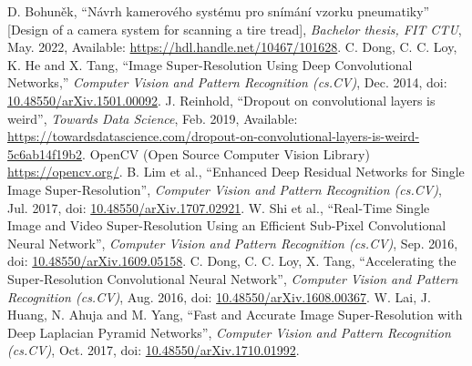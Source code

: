 \documentclass[english]{mvi-report}
\begin{document}
\begin{thebibliography}{9}
 D. Bohuněk, ``Návrh kamerového systému pro snímání vzorku pneumatiky'' [Design of a camera system for scanning a tire tread], \textit{Bachelor thesis, FIT CTU}, May. 2022, Available: \url{https://hdl.handle.net/10467/101628}.
 C. Dong, C. C. Loy, K. He and X. Tang, ``Image Super-Resolution Using Deep Convolutional Networks,'' \textit{Computer Vision and Pattern Recognition (cs.CV)}, Dec. 2014, doi: \href{https://doi.org/10.48550/arXiv.1501.00092}{10.48550/arXiv.1501.00092}.
 J. Reinhold, ``Dropout on convolutional layers is weird'', \textit{Towards Data Science}, Feb. 2019, Available: \url{https://towardsdatascience.com/dropout-on-convolutional-layers-is-weird-5c6ab14f19b2}.
 OpenCV (Open Source Computer Vision Library) \url{https://opencv.org/}.
 B. Lim et al., ``Enhanced Deep Residual Networks for Single Image Super-Resolution'', \textit{Computer Vision and Pattern Recognition (cs.CV)}, Jul. 2017, doi: \href{https://doi.org/10.48550/arXiv.1707.02921}{10.48550/arXiv.1707.02921}.
 W. Shi et al., ``Real-Time Single Image and Video Super-Resolution Using an Efficient Sub-Pixel Convolutional Neural Network'', \textit{Computer Vision and Pattern Recognition (cs.CV)}, Sep. 2016, doi: \href{https://doi.org/10.48550/arXiv.1609.05158}{10.48550/arXiv.1609.05158}.
 C. Dong, C. C. Loy, X. Tang, ``Accelerating the Super-Resolution Convolutional Neural Network'', \textit{Computer Vision and Pattern Recognition (cs.CV)}, Aug. 2016, doi: \href{https://doi.org/10.48550/arXiv.1608.00367}{10.48550/arXiv.1608.00367}.
 W. Lai, J. Huang, N. Ahuja and M. Yang, ``Fast and Accurate Image Super-Resolution with Deep Laplacian Pyramid Networks'', \textit{Computer Vision and Pattern Recognition (cs.CV)}, Oct. 2017, doi: \href{https://doi.org/10.48550/arXiv.1710.01992}{10.48550/arXiv.1710.01992}.
\end{thebibliography}
\end{document}
